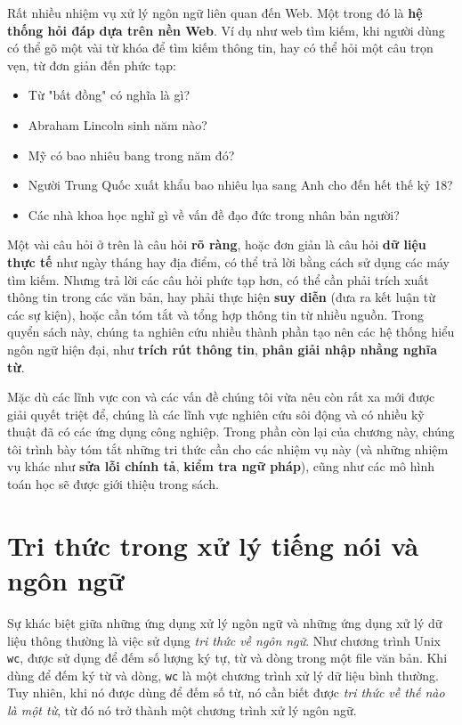 Rất nhiều nhiệm vụ xử lý ngôn ngữ liên quan đến Web. Một trong đó là \textbf{hệ thống hỏi đáp dựa trên nền Web}. Ví dụ như web tìm kiếm, khi người dùng có thể gõ một vài từ khóa để tìm kiếm thông tin, hay có thể hỏi một câu trọn vẹn, từ đơn giản đến phức tạp:

\begin{itemize}[noitemsep]
  \item Từ "bất đồng" có nghĩa là gì?
  \item Abraham Lincoln sinh năm nào?
  \item Mỹ có bao nhiêu bang trong năm đó?
  \item Người Trung Quốc xuất khẩu bao nhiêu lụa sang Anh cho đến hết thế kỷ 18?
  \item Các nhà khoa học nghĩ gì về vấn đề đạo đức trong nhân bản người?
\end{itemize}

Một vài câu hỏi ở trên là câu hỏi \textbf{rõ ràng}, hoặc đơn giản là câu hỏi \textbf{dữ liệu thực tế} như ngày tháng hay địa điểm, có thể trả lời bằng cách sử dụng các máy tìm kiếm. Nhưng trả lời các câu hỏi phức tạp hơn, có thể cần phải trích xuất thông tin trong các văn bản, hay phải thực hiện \textbf{suy diễn} (đưa ra kết luận từ các sự kiện), hoặc cần tóm tắt và tổng hợp thông tin từ nhiều nguồn. Trong quyển sách này, chúng ta nghiên cứu nhiều thành phần tạo nên các hệ thống hiểu ngôn ngữ hiện đại, như \textbf{trích rút thông tin}, \textbf{phân giải nhập nhằng nghĩa từ}.

Mặc dù các lĩnh vực con và các vấn đề chúng tôi vừa nêu còn rất xa mới được giải quyết triệt để, chúng là các lĩnh vực nghiên cứu sôi động và có nhiều kỹ thuật đã có các ứng dụng công nghiệp. Trong phần còn lại của chương này, chúng tôi trình bày tóm tắt những tri thức cần cho các nhiệm vụ này (và những nhiệm vụ khác như \textbf{sửa lỗi chính tả}, \textbf{kiểm tra ngữ pháp}), cũng như các mô hình toán học sẽ được giới thiệu trong sách.

\section{Tri thức trong xử lý tiếng nói và ngôn ngữ}

Sự khác biệt giữa những ứng dụng xử lý ngôn ngữ và những ứng dụng xử lý dữ liệu thông thường là việc sử dụng \textit{tri thức về ngôn ngữ}. Như chương trình Unix \verb|wc|, được sử dụng để đếm số lượng ký tự, từ và dòng trong một file văn bản. Khi dùng để đếm ký từ và dòng, \verb|wc| là một chương trình xử lý dữ liệu bình thường. Tuy nhiên, khi nó được dùng để đếm số từ, nó cần biết được \textit{tri thức về thế nào là một từ}, từ đó nó trở thành một chương trình xử lý ngôn ngữ.

